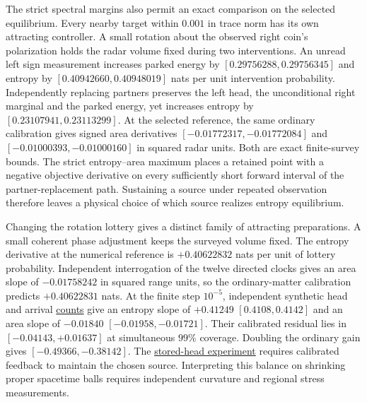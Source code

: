 \documentclass[11pt]{article}
\begin{document}
The strict spectral margins also permit an exact comparison on the
selected equilibrium. Every nearby target within $0.001$ in trace norm
has its own attracting controller. A small rotation about the observed
right coin's polarization holds the radar volume fixed during two
interventions. An unread left sign measurement increases parked energy
by $[0.29756288,0.29756345]$ and entropy by $[0.40942660,0.40948019]$
nats per unit intervention probability. Independently replacing partners
preserves the left head, the unconditional right marginal and the
parked energy, yet increases entropy by $[0.23107941,0.23113299]$.
At the selected reference, the same ordinary calibration gives signed
area derivatives $[-0.01772317,-0.01772084]$ and
$[-0.01000393,-0.01000160]$ in squared radar units. Both are exact
finite-survey bounds. The strict entropy--area maximum places a
retained point with a negative objective derivative on every sufficiently
short forward interval of the partner-replacement path. Sustaining a
source under repeated observation therefore leaves a physical choice of
which source realizes entropy equilibrium.

Changing the rotation lottery gives a distinct family of attracting
preparations. A small coherent phase adjustment keeps the surveyed
volume fixed. The entropy derivative at the numerical reference is
$+0.40622832$ nats per unit of lottery probability. Independent
interrogation of the twelve directed clocks gives an area slope of
$-0.01758242$ in squared range units, so the ordinary-matter calibration
predicts $+0.40622831$ nats. At the finite step $10^{-5}$,
independent synthetic head and arrival
\href{https://github.com/FloatingPragma/observer-patch-holography/tree/main/code/matched_einstein_limit/source_implication/full_algebra/reuse/retained_equilibrium/observer_banks}{counts}
give an entropy slope of $+0.41249$ $[0.4108,0.4142]$ and an area
slope of $-0.01840$ $[-0.01958,-0.01721]$. Their calibrated residual
lies in $[-0.04143,+0.01637]$ at simultaneous $99\%$ coverage.
Doubling the ordinary gain gives $[-0.49366,-0.38142]$. The
\href{https://github.com/FloatingPragma/observer-patch-holography/tree/main/code/matched_einstein_limit/source_implication/full_algebra/reuse/retained_equilibrium}{stored-head experiment}
requires calibrated feedback to maintain the chosen source.
Interpreting this balance on shrinking proper spacetime balls requires
independent curvature and regional stress measurements.
\end{document}
